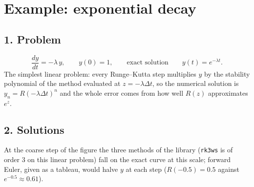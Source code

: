 \documentclass[11pt,a4paper]{article}
\begin{document}
\section*{Example: exponential decay}

\subsection*{1. Problem}
\begin{equation*}
  \frac{dy}{dt} = -\lambda\, y, \qquad y(0) = 1,
  \qquad\text{exact solution}\qquad y(t) = e^{-\lambda t}.
\end{equation*}
The simplest linear problem: every Runge--Kutta step multiplies $y$ by the
stability polynomial of the method evaluated at $z = -\lambda\Delta t$, so the
numerical solution is $y_n = R(-\lambda\Delta t)^n$ and the whole error comes
from how well $R(z)$ approximates $e^{z}$.
\begin{center}

\end{center}

\subsection*{2. Solutions}
\begin{center}
\end{center}
At the coarse step of the figure the three methods of the library
(\texttt{rk3ws} is of order 3 on this linear problem) fall on the exact curve
at this scale; forward Euler, given as a tableau, would halve $y$ at each step
($R(-0.5) = 0.5$ against $e^{-0.5} \approx 0.61$).
\end{document}
